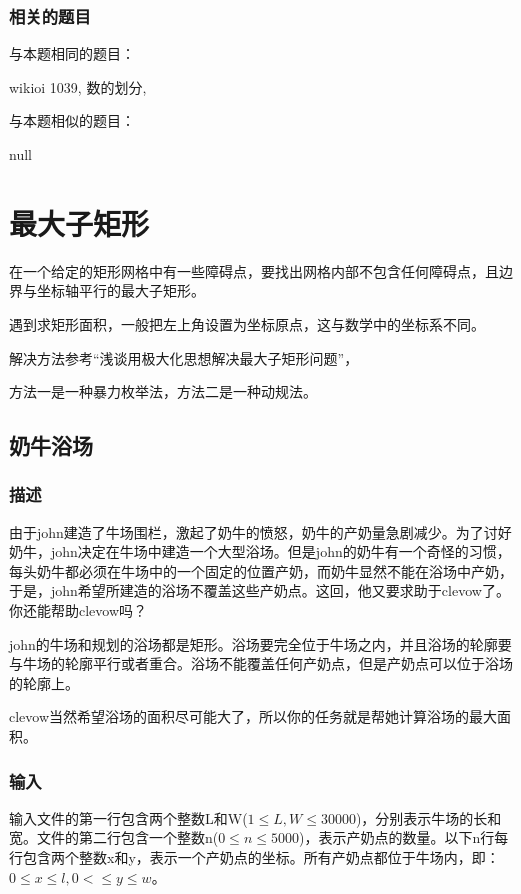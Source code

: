 \subsubsection{相关的题目}
与本题相同的题目：
\begindot
\item wikioi 1039, 数的划分, 
\myenddot

与本题相似的题目：
\begindot
\item  null
\myenddot


\section{最大子矩形} %
在一个给定的矩形网格中有一些障碍点，要找出网格内部不包含任何障碍点，且边界与坐标轴平行的最大子矩形。

遇到求矩形面积，一般把左上角设置为坐标原点，这与数学中的坐标系不同。

解决方法参考“浅谈用极大化思想解决最大子矩形问题”，

方法一是一种暴力枚举法，方法二是一种动规法。

\subsection{奶牛浴场}
\subsubsection{描述}
由于john建造了牛场围栏，激起了奶牛的愤怒，奶牛的产奶量急剧减少。为了讨好奶牛，john决定在牛场中建造一个大型浴场。但是john的奶牛有一个奇怪的习惯，每头奶牛都必须在牛场中的一个固定的位置产奶，而奶牛显然不能在浴场中产奶，于是，john希望所建造的浴场不覆盖这些产奶点。这回，他又要求助于clevow了。你还能帮助clevow吗？

john的牛场和规划的浴场都是矩形。浴场要完全位于牛场之内，并且浴场的轮廓要与牛场的轮廓平行或者重合。浴场不能覆盖任何产奶点，但是产奶点可以位于浴场的轮廓上。

clevow当然希望浴场的面积尽可能大了，所以你的任务就是帮她计算浴场的最大面积。

\subsubsection{输入}
输入文件的第一行包含两个整数L和W($1 \leq L,W \leq 30000$)，分别表示牛场的长和宽。文件的第二行包含一个整数n($0 \leq n \leq 5000$)，表示产奶点的数量。以下n行每行包含两个整数x和y，表示一个产奶点的坐标。所有产奶点都位于牛场内，即：$0 \leq x \leq l, 0< \leq y \leq w$。

